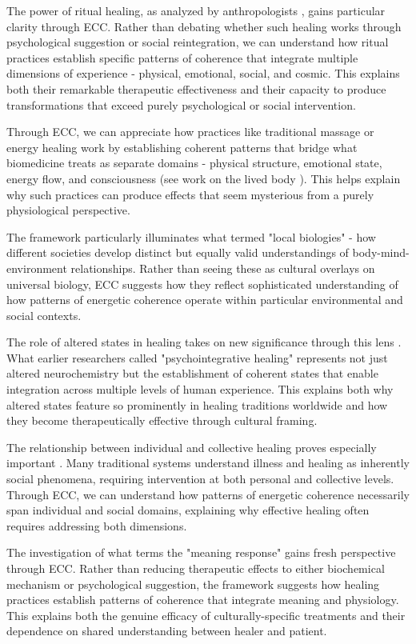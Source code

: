 \begin{refsection}
The power of ritual healing, as analyzed by anthropologists \cite{turner1968drums}, gains particular clarity through ECC. Rather than debating whether such healing works through psychological suggestion or social reintegration, we can understand how ritual practices establish specific patterns of coherence that integrate multiple dimensions of experience - physical, emotional, social, and cosmic. This explains both their remarkable therapeutic effectiveness and their capacity to produce transformations that exceed purely psychological or social intervention.

Through ECC, we can appreciate how practices like traditional massage or energy healing work by establishing coherent patterns that bridge what biomedicine treats as separate domains - physical structure, emotional state, energy flow, and consciousness (see work on the lived body \cite{csordas1993somatic}). This helps explain why such practices can produce effects that seem mysterious from a purely physiological perspective.

The framework particularly illuminates what \cite{lock1993encounters} termed "local biologies" - how different societies develop distinct but equally valid understandings of body-mind-environment relationships. Rather than seeing these as cultural overlays on universal biology, ECC suggests how they reflect sophisticated understanding of how patterns of energetic coherence operate within particular environmental and social contexts.

The role of altered states in healing takes on new significance through this lens \cite{kapferer1991celebration}. What earlier researchers called "psychointegrative healing" represents not just altered neurochemistry but the establishment of coherent states that enable integration across multiple levels of human experience. This explains both why altered states feature so prominently in healing traditions worldwide and how they become therapeutically effective through cultural framing.

The relationship between individual and collective healing proves especially important \cite{kleinman1980patients}. Many traditional systems understand illness and healing as inherently social phenomena, requiring intervention at both personal and collective levels. Through ECC, we can understand how patterns of energetic coherence necessarily span individual and social domains, explaining why effective healing often requires addressing both dimensions.

The investigation of what \cite{moerman2002meaning} terms the "meaning response" gains fresh perspective through ECC. Rather than reducing therapeutic effects to either biochemical mechanism or psychological suggestion, the framework suggests how healing practices establish patterns of coherence that integrate meaning and physiology. This explains both the genuine efficacy of culturally-specific treatments and their dependence on shared understanding between healer and patient.


\end{refsection}
